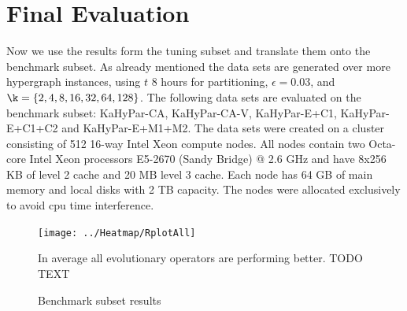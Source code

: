 \documentclass[a4paper,12pt,titlepage, BCOR7mm,headsepline]{scrbook}
\numberwithin{equation}{section}
\begin{document}
\section{Final Evaluation}
Now we use the results form the tuning subset and translate them onto the benchmark subset. As already mentioned the data sets are generated over more hypergraph instances, using $t$ 8 hours for partitioning, $\epsilon = 0.03$, and $\k = \{2,4,8,16,32,64,128\}$. The following data sets are evaluated on the benchmark subset: KaHyPar-CA, KaHyPar-CA-V, KaHyPar-E+C1, KaHyPar-E+C1+C2 and KaHyPar-E+M1+M2. The data sets were created on a cluster consisting of 512 16-way Intel Xeon compute nodes. All nodes contain two Octa-core Intel Xeon processors E5-2670 (Sandy Bridge) @ 2.6 GHz and have 8x256 KB of level 2 cache and 20 MB level 3 cache. Each node has 64 GB of main memory and local disks with 2 TB capacity. The nodes were allocated exclusively to avoid cpu time interference.
\begin{figure}[H]
\caption{Benchmark subset results}
\begin{center}
\texttt{[image: ../Heatmap/RplotAll]}

\end{center}
In average all evolutionary operators are performing better. TODO TEXT
\end{figure}
\end{document}
